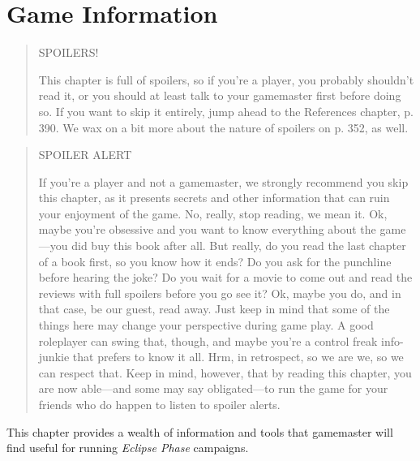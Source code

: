 \chapter{Game Information}
\label{cha:game-information}




\begin{quotation}
\begin{LARGE}
\begin{center}
SPOILERS!
\end{center}
\end{LARGE}
This chapter is full of spoilers, so if you’re a player, you probably shouldn’t read it,
or you should at least talk to your gamemaster first before doing so. If you want
to skip it entirely, jump ahead to the References chapter, p. 390. We wax on a bit
more about the nature of spoilers on p. 352, as well.
\end{quotation}

\pagebreak



\begin{quotation}
\begin{LARGE}
SPOILER ALERT
\end{LARGE}

If you’re a player and not a gamemaster, we strongly recommend you skip this chapter, as it presents
secrets and other information that can ruin your enjoyment of the game. No, really, stop reading, we mean
it. Ok, maybe you’re obsessive and you want to know everything about the game—you did buy this book
after all. But really, do you read the last chapter of a book first, so you know how it ends? Do you ask for
the punchline before hearing the joke? Do you wait for a movie to come out and read the reviews with
full spoilers before you go see it? Ok, maybe you do, and in that case, be our guest, read away. Just keep
in mind that some of the things here may change your perspective during game play. A good roleplayer
can swing that, though, and maybe you’re a control freak info-junkie that prefers to know it all. Hrm, in
retrospect, so we are we, so we can respect that. Keep in mind, however, that by reading this chapter, you
are now able—and some may say obligated—to run the game for your friends who do happen to listen to
spoiler alerts.
\end{quotation}


This chapter provides a wealth of information and 
tools that gamemaster will find useful for running 
\textit{Eclipse Phase} campaigns.

